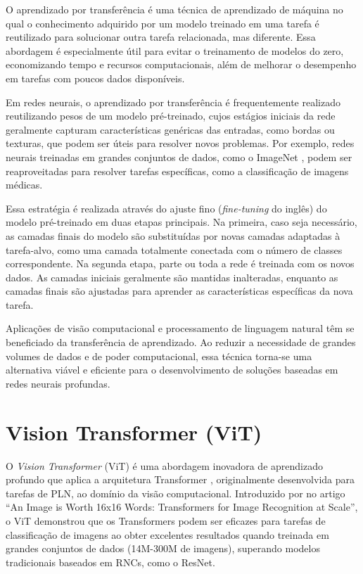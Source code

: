 O aprendizado por transferência \citep{Zhuang2021} é uma técnica de aprendizado de máquina no qual o conhecimento adquirido por um modelo treinado em uma tarefa é reutilizado para solucionar outra tarefa relacionada, mas diferente. Essa abordagem é especialmente útil para evitar o treinamento de modelos do zero, economizando tempo e recursos computacionais, além de melhorar o desempenho em tarefas com poucos dados disponíveis.

Em redes neurais, o aprendizado por transferência é frequentemente realizado reutilizando pesos de um modelo pré-treinado, cujos estágios iniciais da rede geralmente capturam características genéricas das entradas, como bordas ou texturas, que podem ser úteis para resolver novos problemas. Por exemplo, redes neurais treinadas em grandes conjuntos de dados, como o ImageNet \citep{Russakovsky2015}, podem ser reaproveitadas para resolver tarefas específicas, como a classificação de imagens médicas.

Essa estratégia é realizada através do ajuste fino (\textit{fine-tuning} do inglês) do modelo pré-treinado em duas etapas principais. Na primeira, caso seja necessário, as camadas finais do modelo são substituídas por novas camadas adaptadas à tarefa-alvo, como uma camada totalmente conectada com o número de classes correspondente. Na segunda etapa, parte ou toda a rede é treinada com os novos dados. As camadas iniciais geralmente são mantidas inalteradas, enquanto as camadas finais são ajustadas para aprender as características específicas da nova tarefa.

Aplicações de visão computacional e processamento de linguagem natural têm se beneficiado da transferência de aprendizado. Ao reduzir a necessidade de grandes volumes de dados e de poder computacional, essa técnica torna-se uma alternativa viável e eficiente para o desenvolvimento de soluções baseadas em redes neurais profundas.

\section{Vision Transformer (ViT)}\label{sec:vision-transformers}

O \textit{Vision Transformer} (ViT) é uma abordagem inovadora de aprendizado profundo que aplica a arquitetura Transformer \citep{vaswani2023attentionneed}, originalmente desenvolvida para tarefas de PLN, ao domínio da visão computacional. Introduzido por \cite{Dosovitskiy2021} no artigo ``An Image is Worth 16x16 Words: Transformers for Image Recognition at Scale'', o ViT demonstrou que os Transformers podem ser eficazes para tarefas de classificação de imagens ao obter excelentes resultados quando treinada em grandes conjuntos de dados (14M-300M de imagens), superando modelos tradicionais baseados em RNCs, como o ResNet.

